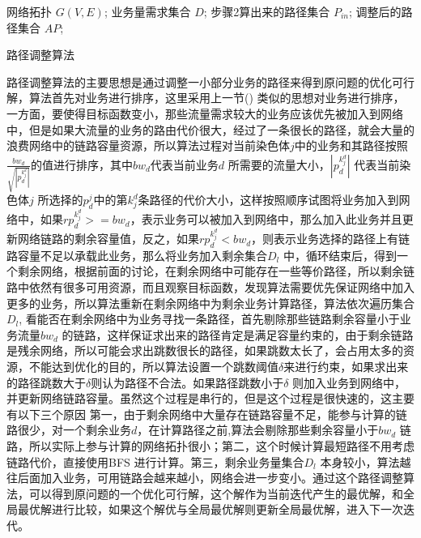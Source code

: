 \begin{algorithm}[t]
\begin{algorithmic}[1]
\Require
网络拓扑 $G(V, E)$;
业务量需求集合 $D$;
步骤2算出来的路径集合 $P_{in}$;
\Ensure
调整后的路径集合 $AP$;
\Else
{}
\EndIf
\EndFor
{}
\EndIf
\EndFor
{}
\EndIf
\EndFor
{}
\end{algorithmic}
\caption{路径调整算法}
\label{PathAdj}
\end{algorithm}

路径调整算法的主要思想是通过调整一小部分业务的路径来得到原问题的优化可行解，算法首先对业务进行排序，这里采用上一节() 类似的思想对业务进行排序，一方面，要使得目标函数变小，那些流量需求较大的业务应该优先被加入到网络中，但是如果大流量的业务的路由代价很大，经过了一条很长的路径，就会大量的浪费网络中的链路容量资源，所以算法过程对当前染色体$j$中的业务和其路径按照$\frac{bw_d}{\sqrt{|p^{k^d_j}_d|}}$的值进行排序，其中${bw_d}$代表当前业务$d$ 所需要的流量大小，$|p^{k^d_j}_d|$ 代表当前染色体$j$ 所选择的$p^j_d$中的第${k^d_j}$条路径的代价大小，这样按照顺序试图将业务加入到网络中，如果$rp^{k^d_j}_d>=bw_d$，表示业务可以被加入到网络中，那么加入此业务并且更新网络链路的剩余容量值，反之，如果$rp^{k^d_j}_d<bw_d$，则表示业务选择的路径上有链路容量不足以承载此业务，那么将业务加入剩余集合$D_l$ 中，循环结束后，得到一个剩余网络，根据前面的讨论，在剩余网络中可能存在一些等价路径，所以剩余链路中依然有很多可用资源，而且观察目标函数，发现算法需要优先保证网络中加入更多的业务，所以算法重新在剩余网络中为剩余业务计算路径，算法依次遍历集合$D_l$, 看能否在剩余网络中为业务寻找一条路径，首先剔除那些链路剩余容量小于业务流量$bw_d$ 的链路，这样保证求出来的路径肯定是满足容量约束的，由于剩余链路是残余网络，所以可能会求出跳数很长的路径，如果跳数太长了，会占用太多的资源，不能达到优化的目的，所以算法设置一个跳数阈值$\delta$来进行约束，如果求出来的路径跳数大于$\delta$则认为路径不合法。如果路径跳数小于$\delta$ 则加入业务到网络中，并更新网络链路容量。虽然这个过程是串行的，但是这个过程是很快速的，这主要有以下三个原因 第一，由于剩余网络中大量存在链路容量不足，能参与计算的链路很少，对一个剩余业务$d$，在计算路径之前,算法会剔除那些剩余容量小于$bw_d$ 链路，所以实际上参与计算的网络拓扑很小；第二，这个时候计算最短路径不用考虑链路代价，直接使用BFS 进行计算。第三，剩余业务量集合$D_l$ 本身较小，算法越往后面加入业务，可用链路会越来越小，网络会进一步变小。通过这个路径调整算法，可以得到原问题的一个优化可行解，这个解作为当前迭代产生的最优解，和全局最优解进行比较，如果这个解优与全局最优解则更新全局最优解，进入下一次迭代。
